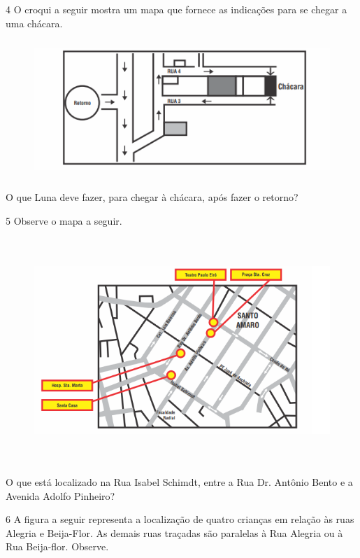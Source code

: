 \num{4}  O croqui a seguir mostra um mapa que fornece as indicações para se
chegar a uma chácara.

\begin{figure}[H]
\centering\includegraphics[width=4.95347in,height=2.04653in]{./imgSAEB_6_MAT/media/image67.png}
\end{figure}

O que Luna deve fazer, para chegar à chácara, após fazer o retorno?


\num{5}  Observe o mapa a seguir.

\begin{figure}[H]
\centering\includegraphics[width=5.90625in,height=3.34375in]{./imgSAEB_6_MAT/media/image68.png}
\end{figure}

O que está localizado na Rua Isabel Schimdt, entre a Rua Dr. Antônio Bento e a Avenida
Adolfo Pinheiro?


\num{6}  A figura a seguir representa a localização de quatro crianças em relação às
ruas Alegria e Beija-Flor. As demais ruas traçadas são paralelas à Rua
Alegria ou à Rua Beija-flor. Observe.

